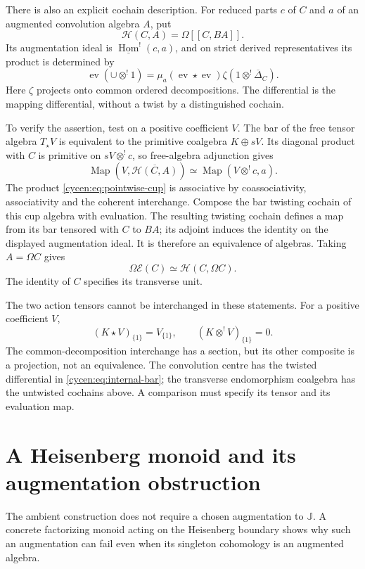 There is also an explicit cochain description. For reduced
parts $c$ of $C$ and $a$ of an augmented convolution algebra
$A$, put
\[
 \mathcal H(C,A)=\Omega[\![C,BA]\!].
\]
Its augmentation ideal is
$\underline{\operatorname{Hom}}^!(c,a)$, and on strict
derived representatives its product is determined by
\begin{equation}\label{cycen:eq:pointwise-cup}
 \operatorname{ev}(\cup\otimes^!1)
 =\mu_a(\operatorname{ev}\star\operatorname{ev})
              \zeta(1\otimes^!\overline\Delta_C).
\end{equation}
Here $\zeta$ projects onto common ordered decompositions.
The differential is the mapping differential, without a
twist by a distinguished cochain.

To verify the assertion, test on a positive coefficient $V$.
The bar of the free tensor algebra $T_\star V$ is equivalent
to the primitive coalgebra $K\oplus sV$. Its diagonal product
with $C$ is primitive on $sV\otimes^!c$, so free-algebra
adjunction gives
\[
 \operatorname{Map}(V,\overline{\mathcal H(C,A)})
 \simeq\operatorname{Map}(V\otimes^!c,a).
\]
The product \eqref{cycen:eq:pointwise-cup} is associative by
coassociativity, associativity and the coherent interchange.
Compose the bar twisting cochain of this cup algebra with
evaluation. The resulting twisting cochain defines a map
from its bar tensored with $C$ to $BA$; its adjoint induces
the identity on the displayed augmentation ideal. It is
therefore an equivalence of algebras. Taking $A=\Omega C$
gives
\[
 \Omega\mathcal E(C)\simeq\mathcal H(C,\Omega C).
\]
The identity of $C$ specifies its transverse unit.

The two action tensors cannot be interchanged in these
statements. For a positive coefficient $V$,
\[
 (K\star V)_{\{1\}}=V_{\{1\}},\qquad
 (K\otimes^!V)_{\{1\}}=0.
\]
The common-decomposition interchange has a section, but its
other composite is a projection, not an equivalence. The
convolution centre has the twisted differential in
\eqref{cycen:eq:internal-bar}; the transverse endomorphism
coalgebra has the untwisted cochains above. A comparison
must specify its tensor and its evaluation map.

\section{A Heisenberg monoid and its augmentation obstruction}
\label{cycen:sec:heisenberg}

The ambient construction does not require a chosen
augmentation to $\mathbb J$. A concrete factorizing monoid
acting on the Heisenberg boundary shows why such an
augmentation can fail even when its singleton cohomology
is an augmented algebra.

